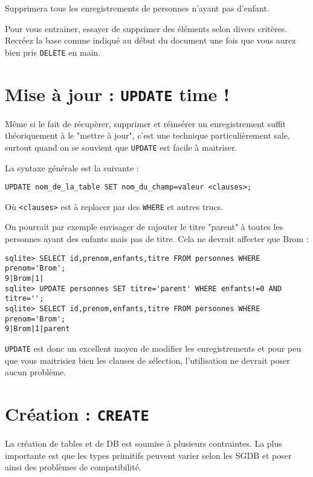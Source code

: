 \documentclass[a4paper, 11pt]{report}
\begin{document}
Supprimera tous les enregistrements de personnes n'ayant pas d'enfant.

Pour vous entrainer, essayer de supprimer des éléments selon divers critères.
Recréez la base comme indiqué au début du document une fois que vous aurez bien pris \texttt{DELETE} en main.

\section{Mise à jour : \texttt{UPDATE} time !}

Même si le fait de récupèrer, supprimer et réinsérer un enregistrement suffit théoriquement à le "mettre à jour", c'est
une technique particulièrement sale, surtout quand on se souvient que \texttt{UPDATE} est facile à maitriser.

La syntaxe générale est la suivante :

\begin{verbatim}
UPDATE nom_de_la_table SET nom_du_champ=valeur <clauses>;
\end{verbatim}

Où \texttt{<clauses>} est à replacer par des \texttt{WHERE} et autres trucs.

On pourrait par exemple envisager de rajouter le titre "parent" à toutes les personnes ayant des enfants mais pas de
titre. Cela ne devrait affecter que Brom :

\begin{verbatim}
sqlite> SELECT id,prenom,enfants,titre FROM personnes WHERE prenom='Brom';
9|Brom|1|
sqlite> UPDATE personnes SET titre='parent' WHERE enfants!=0 AND titre='';
sqlite> SELECT id,prenom,enfants,titre FROM personnes WHERE prenom='Brom';
9|Brom|1|parent
\end{verbatim}

\texttt{UPDATE} est donc un excellent moyen de modifier les enregistrements et pour peu que vous maitrisiez bien les
clauses de sélection, l'utilisation ne devrait poser aucun problème.

\section{Création : \texttt{CREATE}}

La création de tables et de DB est soumise à plusieurs contraintes. La plus importante est que les types primitifs
peuvent varier selon les SGDB et poser ainsi des problèmes de compatibilité.
\end{document}
